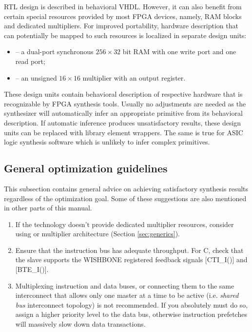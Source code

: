 \documentclass[a4paper,12pt,twoside,extrafontsizes]{memoir}
\begin{document}
\lxp{} RTL design is described in behavioral VHDL. However, it can also benefit from certain special resources provided by most FPGA devices, namely, RAM blocks and dedicated multipliers. For improved portability, hardware description that can potentially be mapped to such resources is localized in separate design units:

\begin{itemize}
	\item {} -- a dual-port synchronous $256 \times 32$ bit RAM with one write port and one read port;
	\item {} -- an unsigned $16 \times 16$ multiplier with an output register.
\end{itemize}

These design units contain behavioral description of respective hardware that is recognizable by FPGA synthesis tools. Usually no adjustments are needed as the synthesizer will automatically infer an appropriate primitive from its behavioral description. If automatic inference produces unsatisfactory results, these design units can be replaced with library element wrappers. The same is true for ASIC logic synthesis software which is unlikely to infer complex primitives.

\subsection{General optimization guidelines}

This subsection contains general advice on achieving satisfactory synthesis results regardless of the optimization goal. Some of these suggestions are also mentioned in other parts of this manual.

\begin{enumerate}
	\item If the technology doesn't provide dedicated multiplier resources, consider using  or  multiplier architecture (Section \ref{sec:generics}).
	
	\item Ensure that the instruction bus has adequate throughput. For \lxp{}C, check that the slave supports the WISHBONE registered feedback signals [CTI\_I()] and [BTE\_I()].
	
	\item Multiplexing instruction and data buses, or connecting them to the same interconnect that allows only one master at a time to be active (i.e. \emph{shared bus} interconnect topology) is not recommended. If you absolutely must do so, assign a higher priority level to the data bus, otherwise instruction prefetches will massively slow down data transactions.
\end{enumerate}
\end{document}
